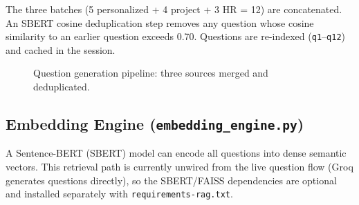 \documentclass[12pt,a4paper]{article}
\begin{document}
The three batches (5 personalized + 4 project + 3 HR = 12) are concatenated. An SBERT cosine deduplication step removes any question whose cosine similarity to an earlier question exceeds 0.70. Questions are re-indexed (\texttt{q1}--\texttt{q12}) and cached in the session.

\begin{figure}[H]
\centering
{}
\caption{Question generation pipeline: three sources merged and deduplicated.}
\end{figure}

\subsection{Embedding Engine (\texttt{embedding\_engine.py})}

A Sentence-BERT (SBERT) model can encode all questions into dense semantic vectors. This retrieval path is currently unwired from the live question flow (Groq generates questions directly), so the SBERT/FAISS dependencies are optional and installed separately with \texttt{requirements-rag.txt}.
\end{document}
